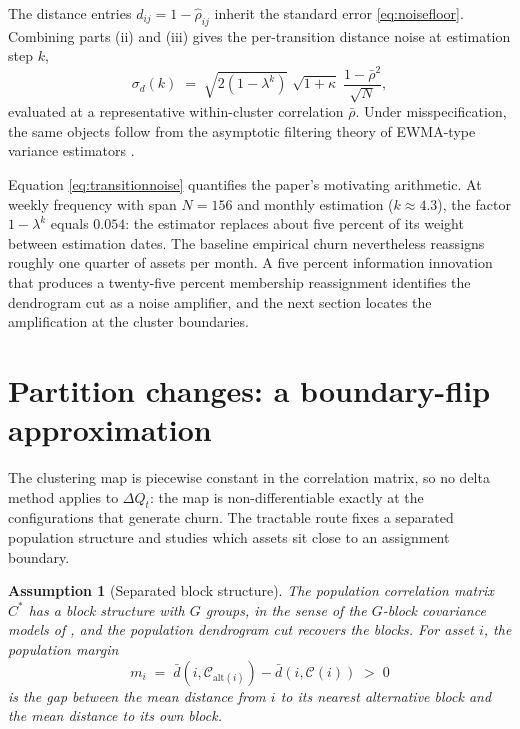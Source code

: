 \documentclass[11pt]{article}
\newtheorem{assumption}{Assumption}
\theoremstyle{remark}
\begin{document}
The distance entries $d_{ij} = 1 - \widehat{\rho}_{ij}$ inherit the standard
error \eqref{eq:noisefloor}. Combining parts (ii) and (iii) gives the
per-transition distance noise at estimation step $k$,
\begin{equation}
\sigma_d(k) \;=\; \sqrt{2\left(1-\lambda^{k}\right)}\;
\sqrt{1+\kappa}\; \frac{1-\bar{\rho}^2}{\sqrt{N}},
\label{eq:transitionnoise}
\end{equation}
evaluated at a representative within-cluster correlation $\bar{\rho}$. Under
misspecification, the same objects follow from the asymptotic filtering theory
of EWMA-type variance estimators \citep{nelson1992filtering,
nelson1994asymptotic}.

Equation \eqref{eq:transitionnoise} quantifies the paper's motivating
arithmetic. At weekly frequency with span $N=156$ and monthly estimation
($k \approx 4.3$), the factor $1-\lambda^{k}$ equals $0.054$: the estimator
replaces about five percent of its weight between estimation dates. The
baseline empirical churn nevertheless reassigns roughly one quarter of assets
per month. A five percent information innovation that produces a twenty-five
percent membership reassignment identifies the dendrogram cut as a noise
amplifier, and the next section locates the amplification at the cluster
boundaries.

\section{Partition changes: a boundary-flip approximation}

The clustering map is piecewise constant in the correlation matrix, so no delta
method applies to $\Delta Q_t$: the map is non-differentiable exactly at the
configurations that generate churn. The tractable route fixes a separated
population structure and studies which assets sit close to an assignment
boundary.

\begin{assumption}[Separated block structure]
\label{ass:block}
The population correlation matrix $C^{*}$ has a block structure with $G$
groups, in the sense of the $G$-block covariance models of
\citet{bunea2020model}, and the population dendrogram cut recovers the blocks.
For asset $i$, the population margin
\begin{equation}
m_i \;=\; \bar{d}\left(i, \mathcal{C}_{\mathrm{alt}(i)}\right)
- \bar{d}\left(i, \mathcal{C}(i)\right)
\;>\; 0
\label{eq:margin}
\end{equation}
is the gap between the mean distance from $i$ to its nearest alternative block
and the mean distance to its own block.
\end{assumption}
\end{document}
